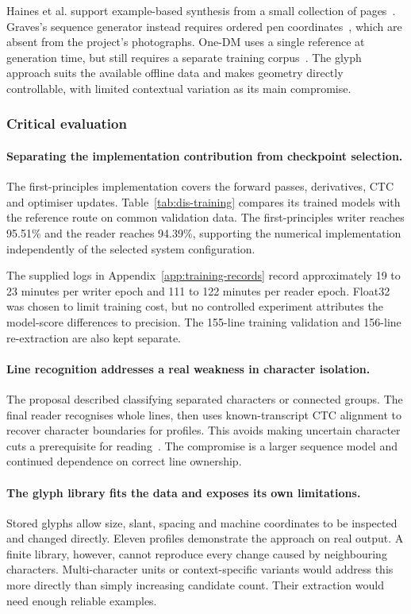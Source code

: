 Haines et al. support example-based synthesis from a small collection of pages~\cite[p.~4]{haines2016}. Graves's sequence generator instead requires ordered pen coordinates~\cite[p.~18]{graves2013}, which are absent from the project's photographs. One-DM uses a single reference at generation time, but still requires a separate training corpus~\cite[p.~9]{dai2024}. The glyph approach suits the available offline data and makes geometry directly controllable, with limited contextual variation as its main compromise.

\subsubsection{Critical evaluation}
\label{sec:dis-choices}
\paragraph{Separating the implementation contribution from checkpoint selection.}
The first-principles implementation covers the forward passes, derivatives, CTC and optimiser updates. Table~\ref{tab:dis-training} compares its trained models with the reference route on common validation data. The first-principles writer reaches 95.51\% and the reader reaches 94.39\%, supporting the numerical implementation independently of the selected system configuration.

The supplied logs in Appendix~\ref{app:training-records} record approximately 19 to 23 minutes per writer epoch and 111 to 122 minutes per reader epoch. Float32 was chosen to limit training cost, but no controlled experiment attributes the model-score differences to precision. The 155-line training validation and 156-line re-extraction are also kept separate.

\paragraph{Line recognition addresses a real weakness in character isolation.}
The proposal described classifying separated characters or connected groups. The final reader recognises whole lines, then uses known-transcript CTC alignment to recover character boundaries for profiles. This avoids making uncertain character cuts a prerequisite for reading~\cite[pp.~2--3]{graves2006}. The compromise is a larger sequence model and continued dependence on correct line ownership.

\paragraph{The glyph library fits the data and exposes its own limitations.}
Stored glyphs allow size, slant, spacing and machine coordinates to be inspected and changed directly. Eleven profiles demonstrate the approach on real output. A finite library, however, cannot reproduce every change caused by neighbouring characters. Multi-character units or context-specific variants would address this more directly than simply increasing candidate count. Their extraction would need enough reliable examples.

